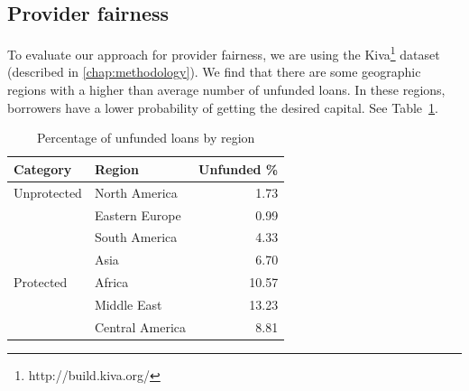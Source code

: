 



\subsection{Provider fairness}

To evaluate our approach for provider fairness, we are using the Kiva\footnote{http://build.kiva.org/} dataset (described in \ref{chap:methodology}). We find that there are some geographic regions with a higher than average number of unfunded loans. In these regions, borrowers have a lower probability of getting the desired capital. See Table~\ref{tab:unfunded}.



\begin{table}
    \centering
\begin{tabular}{l|l|r}
    Category & Region & Unfunded \% \\ \hline
    Unprotected & North America & 1.73 \\
    & Eastern Europe & 0.99 \\
    & South America & 4.33 \\
    & Asia & 6.70 \\ \hline
    Protected & Africa & 10.57 \\
    & Middle East & 13.23 \\
    & Central America & 8.81 \\
\end{tabular}
    \caption{Percentage of unfunded loans by region}
    \label{tab:unfunded}
\end{table}

